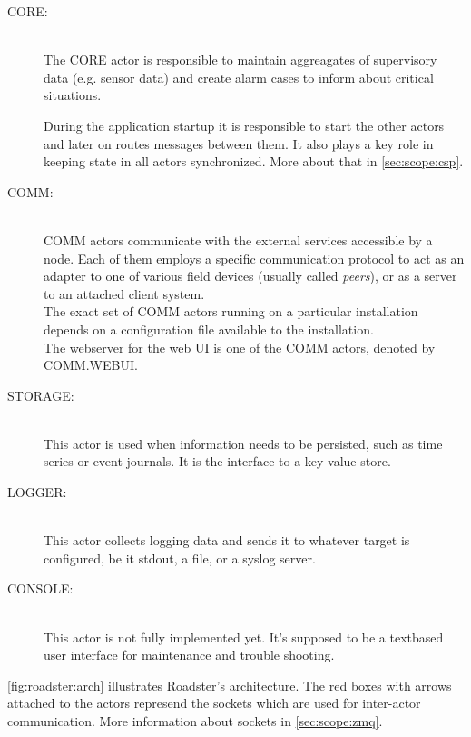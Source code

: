 \begin{description}
	\item [CORE:]\hfill\\
		The CORE actor is responsible to maintain aggreagates of supervisory data
		(e.g. sensor data) and create alarm cases to inform
		about critical situations.

		During the application startup it is responsible to start the
		other actors and later on routes messages between them. It also
		plays a key role in keeping state in all actors synchronized. More
		about that in \autoref{sec:scope:csp}.

	\item [COMM:]\hfill\\
		COMM actors communicate with the external services accessible
		by a node. Each of them employs a specific communication
		protocol to act as an adapter to one of various field devices
		(usually called \emph{peers}), or as a server to an attached client
		system.\\

		The exact set of COMM actors running on a particular
		installation depends on a configuration file available to the
		installation.\\

		The webserver for the web UI is one of the COMM actors, denoted
		by COMM.WEBUI.

	\item [STORAGE:]\hfill\\
		This actor is used when information needs to be persisted, such
		as time series or event journals. It is the interface to a
		key-value store.

	\item [LOGGER:]\hfill\\
		This actor collects logging data and sends it to whatever
		target is configured, be it \gls{stdout}, a file, or a syslog server.

	\item [CONSOLE:]\hfill\\
		This actor is not fully implemented yet. It's supposed to
		be a textbased user interface for maintenance and trouble shooting.
\end{description}

\autoref{fig:roadster:arch} illustrates Roadster's architecture. The red boxes
with arrows attached to the actors represend the \zmq sockets which are used
for inter-actor communication. More information about \zmq sockets in
\autoref{sec:scope:zmq}.


